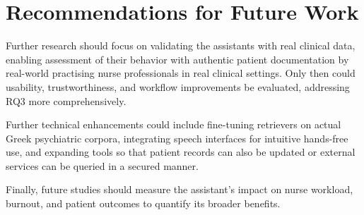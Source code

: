 \section{Recommendations for Future Work}
Further research should focus on validating the assistants with real clinical data, enabling assessment of their behavior with authentic patient documentation by real-world practising nurse professionals in real clinical settings. Only then could usability, trustworthiness, and workflow improvements be evaluated, addressing RQ3 more comprehensively. 

Further technical enhancements could include fine-tuning retrievers on actual Greek psychiatric corpora, integrating speech interfaces for intuitive hands-free use, and expanding tools so that patient records can also be updated or external services can be queried in a secured manner. 

Finally, future studies should measure the assistant's impact on nurse workload, burnout, and patient outcomes to quantify its broader benefits.
 
  